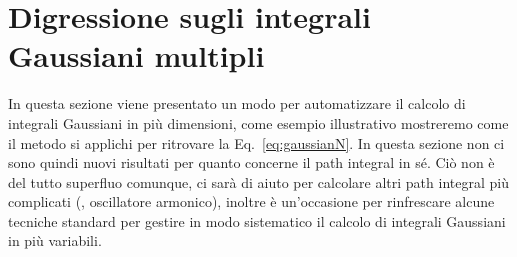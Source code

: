 \section{Digressione sugli integrali Gaussiani multipli} 

In questa sezione viene presentato un modo per automatizzare il calcolo di
integrali Gaussiani in pi\`u dimensioni, come esempio illustrativo  mostreremo
come il metodo 
si applichi per ritrovare la Eq.~\eqref{eq:gaussianN}.  In questa sezione non
ci sono quindi nuovi risultati per quanto concerne  il path integral in s\'e.
Ci\`o non \`e del tutto superfluo comunque, ci sar\`a di aiuto per calcolare
altri path integral pi\`u complicati (\eg, oscillatore armonico), inoltre \`e
un'occasione per rinfrescare alcune tecniche standard per gestire in modo
sistematico il calcolo di integrali Gaussiani in pi\`u variabili.

